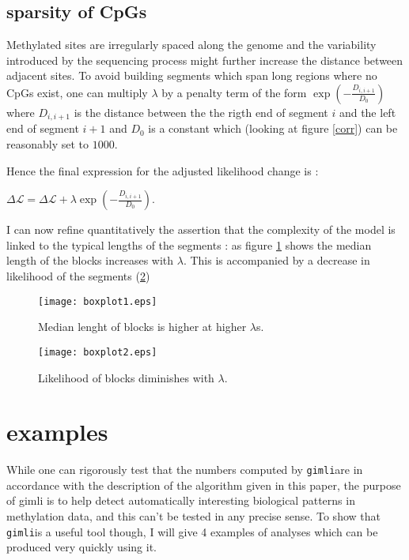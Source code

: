 \documentclass[11pt]{amsart}
\newcommand{\lik}{\ensuremath{\mathcal{L}}}
\newcommand{\gimli}{\texttt{gimli}}
\begin{document}
\subsection{sparsity of CpGs}

Methylated sites are irregularly spaced along the genome and the variability 
introduced by the sequencing process might further increase the distance 
between adjacent sites.
To avoid building segments which span long regions where no CpGs exist, one 
can multiply $\lambda$ by a penalty term of the
form $\exp(-\frac{D_{i,i+1}}{D_0})$ where $D_{i,i+1}$ is the distance 
between the the rigth end of segment $i$ and the left end of segment $i+1$ and 
$D_0$ is a constant which (looking at figure \ref{corr}) can be reasonably 
set to $1000$. 

Hence the final expression for the adjusted likelihood change is :

$\Delta \lik = \Delta \lik+\lambda \exp(-\frac{D_{i,i+1}}{D_0}) $.

I can now refine quantitatively the assertion that the complexity of the model
is linked to the typical lengths of the segments : as figure \ref{boxplot1} 
shows the median length of the blocks increases with $\lambda$. This is 
accompanied by a decrease in likelihood of the segments (\ref{boxplot2})

\begin{figure}\label{boxplot1}
\texttt{[image: boxplot1.eps]}
\caption{Median lenght of blocks is higher at higher $\lambda$s.}
\end{figure}

\begin{figure}\label{boxplot2}
\texttt{[image: boxplot2.eps]}
\caption{Likelihood of blocks diminishes with $\lambda$.}
\end{figure}


\section{examples}

While one can rigorously test that the numbers computed by \gimli are in 
accordance with the description
of the algorithm given in this paper, the purpose of gimli is to help 
detect automatically interesting
biological patterns in methylation data, and this can't be tested in any 
precise sense. To show that \gimli is a useful tool
though, I will give 4 examples of analyses which can be produced very quickly
using it. 
\end{document}
